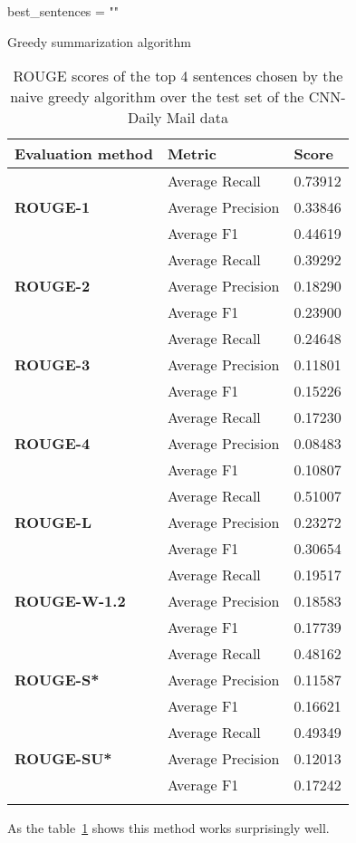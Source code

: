 \begin{algorithm}
	\SetAlgoLined
	best\_sentences = ""\;
	\caption{Greedy summarization algorithm}
\end{algorithm}

\begin{longtable}{| l | l | l |}
	\hline
	\textbf{Evaluation method}&\textbf{Metric}&\textbf{Score}\\ \hline \hline
		\multirow{3}{*}{\textbf{ROUGE-1}}
			&Average Recall&0.73912\\
			&Average Precision&0.33846 \\
			&Average F1&0.44619 \\ \hline \hline
		\multirow{3}{*}{\textbf{ROUGE-2}}
			&Average Recall&0.39292 \\
			&Average Precision&0.18290 \\
			&Average F1&0.23900 \\ \hline \hline
		\multirow{3}{*}{\textbf{ROUGE-3}}
			&Average Recall&0.24648 \\
			&Average Precision&0.11801 \\
			&Average F1&0.15226 \\ \hline \hline
		\multirow{3}{*}{\textbf{ROUGE-4}}
			&Average Recall&0.17230 \\
			&Average Precision&0.08483 \\
			&Average F1&0.10807 \\ \hline \hline
		\multirow{3}{*}{\textbf{ROUGE-L}}
			&Average Recall&0.51007 \\
			&Average Precision&0.23272 \\
			&Average F1&0.30654 \\ \hline \hline
		\multirow{3}{*}{\textbf{ROUGE-W-1.2}}
			&Average Recall&0.19517 \\
			&Average Precision&0.18583 \\
			&Average F1&0.17739 \\ \hline \hline
		\multirow{3}{*}{\textbf{ROUGE-S*}}
			&Average Recall&0.48162 \\
			&Average Precision&0.11587 \\
			&Average F1&0.16621 \\ \hline \hline
		\multirow{3}{*}{\textbf{ROUGE-SU*}}
			&Average Recall&0.49349 \\
			&Average Precision&0.12013 \\
			&Average F1&0.17242 \\ \hline
		\caption{ROUGE scores of the top 4 sentences chosen by the naive greedy algorithm over the test set of the CNN-Daily Mail data}
		\label{tab:extr}
\end{longtable}
As the table~\ref{tab:extr} shows this method works surprisingly well.

